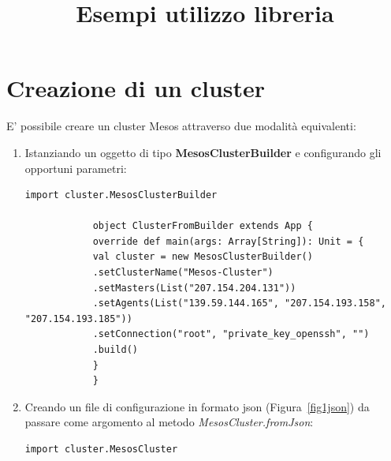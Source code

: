 \documentclass[12pt,a4paper]{article}
\title{Esempi utilizzo libreria}
\author{}
\date{}
\begin{document}
    \maketitle

    \tableofcontents

    \newpage

    \section{Creazione di un cluster}\label{sec:creazioneCluster}
    E' possibile creare un cluster Mesos attraverso due modalit\`a equivalenti:
    \begin{enumerate}
        \item Istanziando un oggetto di tipo \textbf{MesosClusterBuilder} e configurando gli opportuni parametri:
        \begin{lstlisting}[style=myScalastyle]
            import cluster.MesosClusterBuilder

            object ClusterFromBuilder extends App {
            override def main(args: Array[String]): Unit = {
            val cluster = new MesosClusterBuilder()
            .setClusterName("Mesos-Cluster")
            .setMasters(List("207.154.204.131"))
            .setAgents(List("139.59.144.165", "207.154.193.158", "207.154.193.185"))
            .setConnection("root", "private_key_openssh", "")
            .build()
            }
            }
        \end{lstlisting}

        \item Creando un file di configurazione in formato json (Figura~\ref{fig1json}) da passare come argomento al metodo \textit{MesosCluster.fromJson}:
        \begin{lstlisting}[style=myScalastyle]
            import cluster.MesosCluster


\end{lstlisting}
\end{enumerate}
\end{document}
